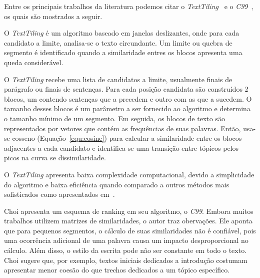 Entre os principais trabalhos da literatura podemos citar o  \textit{TextTiling}~\cite{Hearst1994} e o \textit{C99}~\cite{Choi2000}, os quais são mostrados a seguir.

O \textit{TextTiling} é um algoritmo baseado em janelas deslizantes, onde para cada candidato a limite, analisa-se o texto circundante. Um limite ou quebra de segmento é identificado quando a similaridade entres os blocos apresenta uma queda considerável.


O \textit{TextTiling} recebe uma lista de candidatos a limite, usualmente finais de parágrafo ou finais de sentenças. Para cada posição candidata são construídos 2 blocos, um contendo sentenças que a precedem e outro com as que a sucedem. O tamanho desses blocos é um parâmetro a ser fornecido ao algoritmo e determina o tamanho mínimo de um segmento.
%
Em seguida, os blocos de texto são representados por vetores que contém as frequências de suas palavras. Então, usa-se cosseno (Equação~\ref{equ:cosine}) para calcular a similaridade entre os blocos adjacentes a cada candidato e identifica-se uma transição entre tópicos pelos picos na curva se dissimilaridade.



O \textit{TextTiling} apresenta baixa complexidade computacional, devido a simplicidade do algoritmo e baixa eficiência quando comparado a outros métodos mais sofisticados como apresentados em~\cite{Choi2000, Kern2009, Misra2009}.




Choi \cite{Choi2000} apresenta um esquema de ranking em seu algoritmo, o \textit{C99}. 
%
Embora muitos trabalhos utilizem matrizes de similaridades, o autor traz obervações.
%
Ele aponta que para pequenos segmentos, o cálculo de suas similaridades não é confiável, pois uma ocorrência adicional de uma palavra causa um impacto desproporcional no cálculo.
%
Além disso, o estilo da escrita pode não ser constante em todo o texto. Choi sugere que, por exemplo, textos iniciais dedicados a introdução costumam apresentar menor coesão do que trechos dedicados a um tópico específico. 
%

